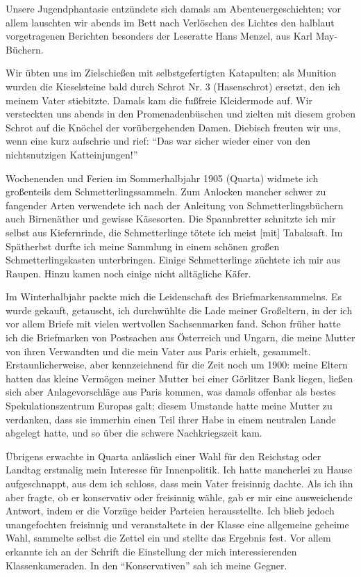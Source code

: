 \documentclass[a5paper,pagesize,10pt,twoside=true]{scrbook}
\renewcommand{\marginpar}[2][]{}
\begin{document}
Unsere Jugendphantasie entzündete sich damals am Abenteuergeschichten; vor allem lauschten wir abends im Bett nach Verlöschen des Lichtes den halblaut vorgetragenen Berichten besonders der Leseratte Hans Menzel, aus Karl May-Büchern.

Wir übten uns im Zielschießen mit selbstgefertigten Katapulten; als Munition wurden die Kieselsteine bald durch Schrot Nr. 3 (Hasenschrot) ersetzt, den ich meinem Vater stiebitzte. Damals kam die fußfreie Kleidermode auf. Wir versteckten uns abends in den Promenadenbüschen und zielten mit diesem groben Schrot auf die Knöchel der vorübergehenden Damen. Diebisch freuten wir uns, wenn eine kurz aufschrie und rief: \enquote{Das war sicher wieder einer von den nichtsnutzigen Katteinjungen!}

\marginpar{55}
Wochenenden und Ferien im Sommerhalbjahr 1905 (Quarta) widmete ich großenteils dem Schmetterlingssammeln. Zum Anlocken mancher schwer zu fangender Arten verwendete ich nach der Anleitung von Schmetterlingsbüchern auch Birnenäther und gewisse Käsesorten. Die Spannbretter schnitzte ich mir selbst aus Kiefernrinde, die Schmetterlinge tötete ich meist [mit] Tabaksaft. Im Spätherbst durfte ich meine Sammlung in einem schönen großen Schmetterlingskasten unterbringen. Einige Schmetterlinge züchtete ich mir aus Raupen. Hinzu kamen noch einige nicht alltägliche Käfer.

Im Winterhalbjahr packte mich die Leidenschaft des Briefmarkensammelns. Es wurde gekauft, getauscht, ich durchwühlte die Lade meiner Großeltern, in der ich vor allem Briefe mit vielen wertvollen Sachsenmarken fand. Schon früher hatte ich die Briefmarken von Postsachen aus Österreich und Ungarn, die meine Mutter von ihren Verwandten und die mein Vater aus Paris erhielt, gesammelt. Erstaunlicherweise, aber kennzeichnend für die Zeit noch um 1900: meine Eltern hatten das kleine Vermögen meiner Mutter bei einer Görlitzer Bank liegen, ließen sich aber Anlagevorschläge aus Paris kommen, was damals offenbar als bestes Spekulationszentrum Europas galt; diesem Umstande hatte meine Mutter zu verdanken, dass sie immerhin einen Teil ihrer Habe in einem neutralen Lande abgelegt hatte, und so über die schwere Nachkriegszeit kam.

Übrigens erwachte in Quarta anlässlich einer Wahl für den Reichstag oder Landtag erstmalig mein Interesse für Innenpolitik. Ich hatte mancherlei zu Hause aufgeschnappt, aus dem ich schloss, dass mein Vater freisinnig dachte. Als ich ihn aber fragte, ob er konservativ oder freisinnig wähle, gab er mir eine ausweichende Antwort, indem er die Vorzüge beider Parteien herausstellte. Ich blieb jedoch unangefochten freisinnig und veranstaltete in der Klasse eine allgemeine geheime Wahl, sammelte selbst die Zettel ein und stellte das Ergebnis fest. Vor allem erkannte ich an der Schrift die Einstellung der mich interessierenden Klassenkameraden. In den \enquote{Konservativen} sah ich meine Gegner.
\end{document}
